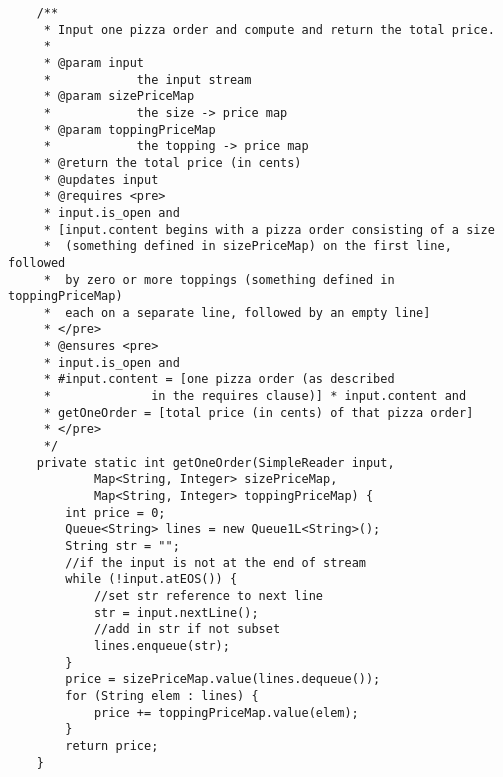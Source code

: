 \documentclass[10pt]{article}
\begin{document}
\begin{lstlisting}
    /**
     * Input one pizza order and compute and return the total price.
     *
     * @param input
     *            the input stream
     * @param sizePriceMap
     *            the size -> price map
     * @param toppingPriceMap
     *            the topping -> price map
     * @return the total price (in cents)
     * @updates input
     * @requires <pre>
     * input.is_open and
     * [input.content begins with a pizza order consisting of a size
     *  (something defined in sizePriceMap) on the first line, followed
     *  by zero or more toppings (something defined in toppingPriceMap)
     *  each on a separate line, followed by an empty line]
     * </pre>
     * @ensures <pre>
     * input.is_open and
     * #input.content = [one pizza order (as described
     *              in the requires clause)] * input.content and
     * getOneOrder = [total price (in cents) of that pizza order]
     * </pre>
     */
    private static int getOneOrder(SimpleReader input,
            Map<String, Integer> sizePriceMap,
            Map<String, Integer> toppingPriceMap) {
        int price = 0;
        Queue<String> lines = new Queue1L<String>();
        String str = "";
        //if the input is not at the end of stream
        while (!input.atEOS()) {
            //set str reference to next line
            str = input.nextLine();
            //add in str if not subset
            lines.enqueue(str);
        }
        price = sizePriceMap.value(lines.dequeue());
        for (String elem : lines) {
            price += toppingPriceMap.value(elem);
        }
        return price;
    }
\end{lstlisting}
\end{document}
